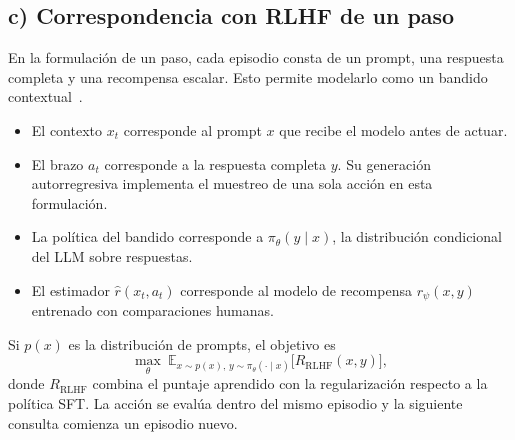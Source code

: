 \subsection*{c) Correspondencia con RLHF de un paso}

En la formulación de un paso, cada episodio consta de un prompt,
una respuesta completa y una recompensa escalar. Esto permite
modelarlo como un bandido contextual~\cite{li2010,ouyang2022}.

\begin{itemize}
    \item El contexto $x_t$ corresponde al prompt $x$ que recibe el
    modelo antes de actuar.
    \item El brazo $a_t$ corresponde a la respuesta completa $y$.
    Su generación autorregresiva implementa el muestreo de una sola
    acción en esta formulación.
    \item La política del bandido corresponde a $\pi_\theta(y\mid x)$,
    la distribución condicional del LLM sobre respuestas.
    \item El estimador $\hat r(x_t,a_t)$ corresponde al modelo de
    recompensa $r_\psi(x,y)$ entrenado con comparaciones humanas.
\end{itemize}

Si $p(x)$ es la distribución de prompts, el objetivo es
\[
    \max_\theta\ \mathbb{E}_{x\sim p(x),\,y\sim\pi_\theta(\cdot\mid x)}
    \bigl[R_{\mathrm{RLHF}}(x,y)\bigr],
\]
donde $R_{\mathrm{RLHF}}$ combina el puntaje aprendido con la
regularización respecto a la política SFT. La acción se evalúa
dentro del mismo episodio y la siguiente consulta comienza un
episodio nuevo.

